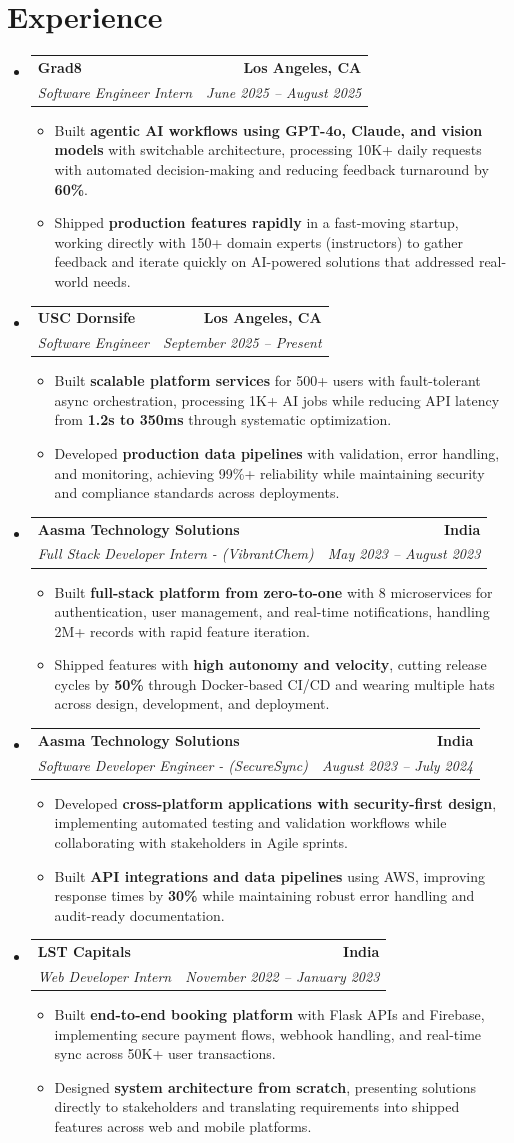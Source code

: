 \documentclass[letterpaper,10pt]{article}
\makeatletter
\newcommand{\resumeItem}[1]{\item\small{{#1 \vspace{-2pt}}}}
\newcommand{\resumeSubheading}[4]{\vspace{-1pt}\item\begin{tabular*}{1.0\textwidth}[t]{l@{\extracolsep{\fill}}r}\textbf{#1} & \textbf{\small #2} \\\textit{\small#3} & \textit{\small #4} \\\end{tabular*}\vspace{-2pt}}
\newcommand{\resumeSubHeadingListStart}{\begin{itemize}[leftmargin=0.0in, label={}]}
\newcommand{\resumeSubHeadingListEnd}{\end{itemize}}
\newcommand{\resumeItemListStart}{\begin{itemize}[leftmargin=0.15in,label=\textbullet,itemsep=2pt,topsep=0pt,parsep=0pt,partopsep=0pt]}
\newcommand{\resumeItemListEnd}{\end{itemize}\vspace{-4pt}}
\makeatother
\begin{document}
\section{Experience}
\resumeSubHeadingListStart
\resumeSubheading{Grad8}{Los Angeles, CA}{Software Engineer Intern}{June 2025 -- August 2025}
\resumeItemListStart
\resumeItem{Built \textbf{agentic AI workflows using GPT-4o, Claude, and vision models} with switchable architecture, processing 10K+ daily requests with automated decision-making and reducing feedback turnaround by \textbf{60\%}.}
\resumeItem{Shipped \textbf{production features rapidly} in a fast-moving startup, working directly with 150+ domain experts (instructors) to gather feedback and iterate quickly on AI-powered solutions that addressed real-world needs.}
\resumeItemListEnd
\resumeSubheading{USC Dornsife}{Los Angeles, CA}{Software Engineer}{September 2025 -- Present}
\resumeItemListStart
\resumeItem{Built \textbf{scalable platform services} for 500+ users with fault-tolerant async orchestration, processing 1K+ AI jobs while reducing API latency from \textbf{1.2s to 350ms} through systematic optimization.}
\resumeItem{Developed \textbf{production data pipelines} with validation, error handling, and monitoring, achieving 99\%+ reliability while maintaining security and compliance standards across deployments.}
\resumeItemListEnd
\resumeSubheading{Aasma Technology Solutions}{India}{Full Stack Developer Intern - (VibrantChem)}{May 2023 -- August 2023}
\resumeItemListStart
\resumeItem{Built \textbf{full-stack platform from zero-to-one} with 8 microservices for authentication, user management, and real-time notifications, handling 2M+ records with rapid feature iteration.}
\resumeItem{Shipped features with \textbf{high autonomy and velocity}, cutting release cycles by \textbf{50\%} through Docker-based CI/CD and wearing multiple hats across design, development, and deployment.}
\resumeItemListEnd
\resumeSubheading{Aasma Technology Solutions}{India}{Software Developer Engineer - (SecureSync)}{August 2023 -- July 2024}
\resumeItemListStart
\resumeItem{Developed \textbf{cross-platform applications with security-first design}, implementing automated testing and validation workflows while collaborating with stakeholders in Agile sprints.}
\resumeItem{Built \textbf{API integrations and data pipelines} using AWS, improving response times by \textbf{30\%} while maintaining robust error handling and audit-ready documentation.}
\resumeItemListEnd
\resumeSubheading{LST Capitals}{India}{Web Developer Intern}{November 2022 -- January 2023}
\resumeItemListStart
\resumeItem{Built \textbf{end-to-end booking platform} with Flask APIs and Firebase, implementing secure payment flows, webhook handling, and real-time sync across 50K+ user transactions.}
\resumeItem{Designed \textbf{system architecture from scratch}, presenting solutions directly to stakeholders and translating requirements into shipped features across web and mobile platforms.}
\resumeItemListEnd
\resumeSubHeadingListEnd
\vspace{-14pt}
\end{document}
